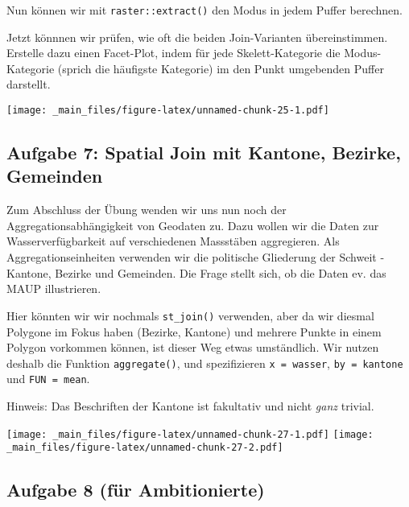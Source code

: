 \documentclass[]{book}
\newenvironment{Shaded}{\begin{snugshade}}{\end{snugshade}}
\newcommand{\DataTypeTok}[1]{\textcolor[rgb]{0.13,0.29,0.53}{#1}}
\newcommand{\DecValTok}[1]{\textcolor[rgb]{0.00,0.00,0.81}{#1}}
\newcommand{\KeywordTok}[1]{\textcolor[rgb]{0.13,0.29,0.53}{\textbf{#1}}}
\newcommand{\NormalTok}[1]{#1}
\newcommand{\OperatorTok}[1]{\textcolor[rgb]{0.81,0.36,0.00}{\textbf{#1}}}
\newcommand{\StringTok}[1]{\textcolor[rgb]{0.31,0.60,0.02}{#1}}
\begin{document}
Nun können wir mit \texttt{raster::extract()} den Modus in jedem Puffer berechnen.

\begin{Shaded}
\end{Shaded}

Jetzt könnnen wir prüfen, wie oft die beiden Join-Varianten übereinstimmen. Erstelle dazu einen Facet-Plot, indem für jede Skelett-Kategorie die Modus-Kategorie (sprich die häufigste Kategorie) im den Punkt umgebenden Puffer darstellt.

\texttt{[image: \_main\_files/figure-latex/unnamed-chunk-25-1.pdf]}

\hypertarget{aufgabe-7-spatial-join-mit-kantone-bezirke-gemeinden}{%
\subsection{Aufgabe 7: Spatial Join mit Kantone, Bezirke, Gemeinden}\label{aufgabe-7-spatial-join-mit-kantone-bezirke-gemeinden}}

Zum Abschluss der Übung wenden wir uns nun noch der Aggregationsabhängigkeit von Geodaten zu. Dazu wollen wir die Daten zur Wasserverfügbarkeit auf verschiedenen Massstäben aggregieren. Als Aggregationseinheiten verwenden wir die politische Gliederung der Schweit - Kantone, Bezirke und Gemeinden. Die Frage stellt sich, ob die Daten ev. das MAUP illustrieren.

Hier könnten wir wir nochmals \texttt{st\_join()} verwenden, aber da wir diesmal Polygone im Fokus haben (Bezirke, Kantone) und mehrere Punkte in einem Polygon vorkommen können, ist dieser Weg etwas umständlich. Wir nutzen deshalb die Funktion \texttt{aggregate()}, und spezifizieren \texttt{x\ =\ wasser}, \texttt{by\ =\ kantone} und \texttt{FUN\ =\ mean}.

Hinweis: Das Beschriften der Kantone ist fakultativ und nicht \emph{ganz} trivial.

\texttt{[image: \_main\_files/figure-latex/unnamed-chunk-27-1.pdf]} \texttt{[image: \_main\_files/figure-latex/unnamed-chunk-27-2.pdf]}

\hypertarget{aufgabe-8-fur-ambitionierte}{%
\subsection{Aufgabe 8 (für Ambitionierte)}\label{aufgabe-8-fur-ambitionierte}}
\end{document}

